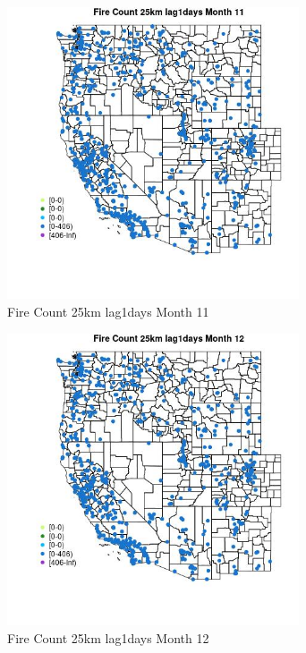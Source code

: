 \begin{figure} 
\centering  
\includegraphics[width=0.77\textwidth]{Code_Outputs/Report_ML_input_PM25_Step4_part_f_de_duplicated_aveswNAs_MapObsMo11Fire_Count_25km_lag1days.jpg} 
\caption{\label{fig:Report_ML_input_PM25_Step4_part_f_de_duplicated_aveswNAsMapObsMo11Fire_Count_25km_lag1days}Fire Count 25km lag1days Month 11} 
\end{figure} 
 

\begin{figure} 
\centering  
\includegraphics[width=0.77\textwidth]{Code_Outputs/Report_ML_input_PM25_Step4_part_f_de_duplicated_aveswNAs_MapObsMo12Fire_Count_25km_lag1days.jpg} 
\caption{\label{fig:Report_ML_input_PM25_Step4_part_f_de_duplicated_aveswNAsMapObsMo12Fire_Count_25km_lag1days}Fire Count 25km lag1days Month 12} 
\end{figure} 
 

